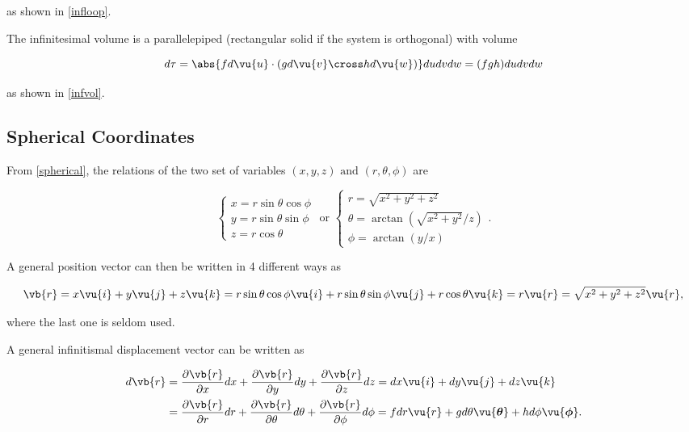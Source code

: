 \documentclass[english,a4paper,12pt]{report}
\begin{document}
as shown in \cref{infloop}.

	
The infinitesimal volume is a parallelepiped (rectangular solid if the system is orthogonal) with volume

\begin{equation}
    d \tau = \abs{fd \vu{u} \cdot (gd \vu{v} \cross hd \vu{w} )}dudvdw = (fgh)dudvdw 
\end{equation}

as shown in \cref{infvol}. 

	
\subsection{Spherical Coordinates}


From \cref{spherical}, the relations of the two set of variables \((x,y,z) \text { and } (r,\theta ,\phi  )\)  are

\begin{equation}
    \begin{cases} x = r\sin \theta \cos \phi \\ y = r\sin \theta \sin \phi \\ z = r\cos \theta \end{cases} \text { or } \begin{cases} r = \sqrt{x^2+y^2+z^2} \\  \theta = \arctan {\left(\sqrt{x^2+y^2}/z   \right)} \\  \phi = \arctan {\left(y /x\right)} \end{cases}. 
\end{equation}

A general position vector can then be written in 4 different ways as 

\begin{equation}
    \vb{r} = x \vu{i} + y \vu{j} + z \vu{k} = r\sin \theta \cos \phi \vu{i} + r\sin \theta \sin \phi \vu{j} + r \cos \theta \vu{k} = r \vu{r} = \sqrt{x^2+y^2+z^2}\vu{r}, 
\end{equation}

where the last one is seldom used.

A general infinitismal displacement vector can be written as 

\begin{equation}
    \begin{aligned}
    d \vb{r} &= \frac{\partial \vb{r} }{\partial x} dx + \frac{\partial \vb{r} }{\partial y} dy + \frac{\partial \vb{r} }{\partial z} dz = dx \vu{i} + dy \vu{j} + dz \vu{k} \\ &= \frac{\partial \vb{r} }{\partial r} dr + \frac{\partial \vb{r} }{\partial \theta }d\theta + \frac{\partial \vb{r} }{\partial \phi }d \phi =f dr \vu{r} +g d\theta \vu{\boldsymbol{\theta } } +h  d \phi \vu{\boldsymbol{\phi } }. 
    \end{aligned}
\end{equation}
\end{document}
